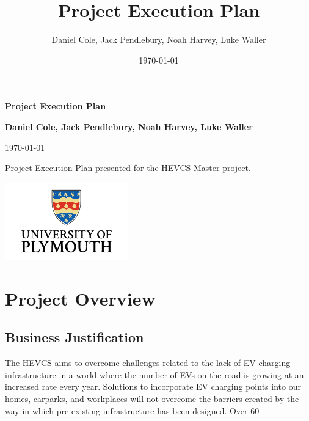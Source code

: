 \documentclass [12pt]{article}
\title{Project Execution Plan}
\author{Daniel Cole, Jack Pendlebury, Noah Harvey, Luke Waller}
\date{\today}
\begin{document}
\begin{titlepage}
    \begin{center}
        \vspace*{1cm}

        {\Huge \textbf{Project Execution Plan}}

        \vspace{1.5cm}

        \textbf{Daniel Cole, Jack Pendlebury, Noah Harvey, Luke Waller}

        \today

        \vfill

        Project Execution Plan presented for the HEVCS Master project.

        \vspace{0.8cm}

        \includegraphics[width=0.4\textwidth]{UOP_Logo.png}

    \end{center}
\end{titlepage}

\newpage
{}
\setcounter{page}{1}
\tableofcontents
\newpage

\newpage
\section{Project Overview}\label{sec:section_1}
\subsection{Business Justification}\label{sec:business_justification}
The HEVCS aims to overcome challenges related to the lack of EV charging infrastructure in a world where the number of EVs on the road is growing at an increased rate every year. Solutions to incorporate EV charging points into our homes, carparks, and workplaces will not overcome the barriers created by the way in which pre-existing infrastructure has been designed. Over 60%
\end{document}
